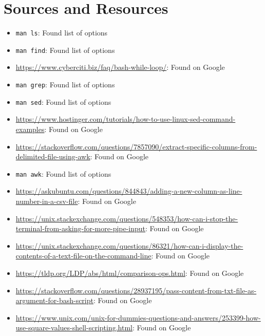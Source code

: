 \documentclass{article}
\begin{document}
\section{Sources and Resources}

\begin{flushleft}
\begin{itemize}
    \item{\texttt{man ls}: Found list of options}
    \item{\texttt{man find}: Found list of options}
    \item{\url{https://www.cyberciti.biz/faq/bash-while-loop/}: Found on Google}
    \item{\texttt{man grep}: Found list of options}
    \item{\texttt{man sed}: Found list of options}
    \item{\url{https://www.hostinger.com/tutorials/how-to-use-linux-sed-command-examples}: Found on Google}
    \item{\url{https://stackoverflow.com/questions/7857090/extract-specific-columns-from-delimited-file-using-awk}: Found on Google}
    \item{\texttt{man awk}: Found list of options}
    \item{\url{https://askubuntu.com/questions/844843/adding-a-new-column-as-line-number-in-a-csv-file}: Found on Google}
    \item{\url{https://unix.stackexchange.com/questions/548353/how-can-i-stop-the-terminal-from-asking-for-more-pipe-input}: Found on Google}
    \item{\url{https://unix.stackexchange.com/questions/86321/how-can-i-display-the-contents-of-a-text-file-on-the-command-line}: Found on Google}
    \item{\url{https://tldp.org/LDP/abs/html/comparison-ops.html}: Found on Google}
    \item{\url{https://stackoverflow.com/questions/28937195/pass-content-from-txt-file-as-argument-for-bash-script}: Found on Google}
    \item{\url{https://www.unix.com/unix-for-dummies-questions-and-answers/253399-how-use-square-values-shell-scripting.html}: Found on Google}      
\end{itemize}
\end{flushleft}
\end{document}
